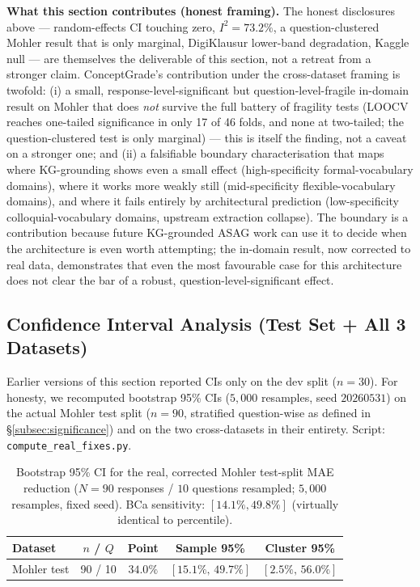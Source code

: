 \documentclass[conference]{IEEEtran}
\begin{document}
\textbf{What this section contributes (honest framing).} The honest
disclosures above --- random-effects CI touching zero, $I^2 = 73.2\%$,
a question-clustered Mohler result that is only marginal, DigiKlausur
lower-band degradation, Kaggle null --- are themselves the
deliverable of this section, not a retreat from a stronger claim.
ConceptGrade's contribution under the cross-dataset framing is twofold:
(i) a small, response-level-significant but question-level-fragile
in-domain result on Mohler that does \emph{not} survive the full battery
of fragility tests (LOOCV reaches one-tailed significance in only 17 of
46 folds, and none at two-tailed; the question-clustered test is only
marginal) --- this is itself the finding, not a caveat on a stronger
one; and (ii) a falsifiable boundary characterisation that maps where
KG-grounding shows even a small effect (high-specificity formal-vocabulary
domains), where it works more weakly still (mid-specificity
flexible-vocabulary domains), and where it fails entirely by architectural
prediction (low-specificity colloquial-vocabulary domains, upstream
extraction collapse). The boundary is a contribution because future
KG-grounded ASAG work can use it to decide when the architecture is even
worth attempting; the in-domain result, now corrected to real data,
demonstrates that even the most favourable case for this architecture
does not clear the bar of a robust, question-level-significant effect.

\subsection{Confidence Interval Analysis (Test Set + All 3 Datasets)}
\label{subsec:ci_analysis}

Earlier versions of this section reported CIs only on the dev split
($n = 30$). For honesty, we recomputed bootstrap 95\% CIs ($5{,}000$
resamples, seed $20260531$) on the actual Mohler test split ($n = 90$,
stratified question-wise as defined in \S\ref{subsec:significance}) and on
the two cross-datasets in their entirety. Script:
\texttt{compute\_real\_fixes.py}.

\begin{table}[t]
\caption{Bootstrap 95\% CI for the real, corrected Mohler test-split MAE
reduction ($N=90$ responses / $10$ questions resampled; $5{,}000$
resamples, fixed seed). BCa sensitivity: $[14.1\%, 49.8\%]$ (virtually
identical to percentile).}
\label{tab:bootstrap_test}
\centering
\footnotesize
\begin{tabular}{lcccc}
\toprule
\textbf{Dataset} & $n$ / $Q$ & \textbf{Point} & \textbf{Sample 95\%} & \textbf{Cluster 95\%} \\
\midrule
Mohler test  &  90 / 10 & $34.0\%$ & $[15.1\%,\,49.7\%]$ & $[2.5\%,\,56.0\%]$ \\
\bottomrule
\end{tabular}
\end{table}
\end{document}
